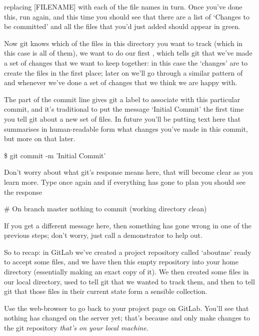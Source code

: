 
replacing [FILENAME] with each of the file names in turn. Once you've done this, run  again, and this time you should see that there are a list of `Changes to be committed' and all the files that you'd just added should appear in green. 

Now git knows which of the files in this directory you want to track (which in this case is all of them), we want to do our first , which tells git that we've made a set of changes that we want to keep together: in this case the `changes' are to create the files in the first place; later on we'll go through a similar pattern of  and  whenever we've done a set of changes that we think we are happy with. 

The  part of the commit line gives git a label to associate with this particular commit, and it's traditional to put the message `Initial Commit' the first time you tell git about a new set of files. In future you'll be putting text here that summarises in human-readable form what changes you've made in this commit, but more on that later.

\begin{ttoutenv}
\$ git commit -m 'Initial Commit'
\end{ttoutenv}

Don't worry about what git's response means here, that will become clear as you learn more. Type  once again and if everything has gone to plan you should see the response

\begin{ttoutenv}
# On branch master
nothing to commit (working directory clean)
\end{ttoutenv}

If you get a different message here, then something has gone wrong in one of the previous steps; don't worry, just call a demonstrator to help out. 

So to recap: in GitLab we've created a project repository called `aboutme' ready to accept some files, and we have then  this empty repository into your home directory (essentially making an exact copy of it). We then created some files in our local directory, used  to tell git that we wanted to track them, and then  to tell git that those files in their current state form a sensible collection. 

Use the web-browser to go back to your  project page on GitLab. You'll see that nothing has changed on the server yet; that's because  and  only make changes to the git repository \emph{that's on your local machine}.

